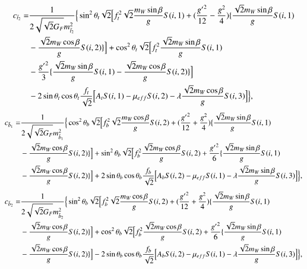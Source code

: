 \documentclass[final,3p,times]{elsarticle}
\begin{document}
\begin{equation}
\begin{aligned}
c_{\tilde{t}_2} = & {1 \over 2\sqrt{\sqrt{2}G_{F}} m_{\tilde{t}_2}^2}\Big\{\sin^2 \theta_t \sqrt{2}\Big[f_{t}^2 \sqrt{2} {m_{W} \sin\beta \over g} S(i,1) + ({{g'}^2 \over 12} - {g^2 \over 4}) \{{\sqrt{2} m_{W} \sin\beta \over g} S(i,1) \\ & -{\sqrt{2} m_{W} \cos\beta \over g}S(i,2)\}\Big] + \cos^2 \theta_t \sqrt{2} \Big[ f_{t}^2 {\sqrt{2} m_{W} \sin\beta \over g}S(i,1) \\ & - {{g'}^2 \over 3}\{{\sqrt{2} m_{W} \sin\beta \over g}S(i,1) - {\sqrt{2} m_{W} \cos\beta \over g} S(i,2)\}\Big] \\ & - 2\sin\theta_t \cos\theta_t {f_{t} \over \sqrt{2}}\Big[A_{t}S(i,1) - \mu_{eff}S(i,2) - \lambda {\sqrt{2} m_{W} \cos\beta \over g}S(i,3)\Big]\Big\},
\end{aligned}
\end{equation}
\begin{equation}
\begin{aligned}
c_{\tilde{b}_1} = & {1 \over 2\sqrt{\sqrt{2}G_{F}} m_{\tilde{b}_1}^2}\Big\{\cos^2 \theta_b \sqrt{2}\Big[f_{b}^2 \sqrt{2} {m_{W} \cos\beta \over g} S(i,2) + ({{g'}^2 \over 12} + {g^2 \over 4}) \{{\sqrt{2} m_{W} \sin\beta \over g} S(i,1) \\ & -{\sqrt{2} m_{W} \cos\beta \over g}S(i,2)\}\Big] + \sin^2 \theta_b \sqrt{2} \Big[ f_{b}^2 {\sqrt{2} m_{W} \cos\beta \over g}S(i,2) + {{g'}^2 \over 6}\{{\sqrt{2} m_{W} \sin\beta \over g}S(i,1) \\ & - {\sqrt{2} m_{W} \cos\beta \over g} S(i,2)\}\Big] + 2\sin\theta_b \cos\theta_b {f_{b} \over \sqrt{2}}\Big[A_{b}S(i,2) - \mu_{eff}S(i,1) - \lambda {\sqrt{2} m_{W} \sin\beta \over g}S(i,3)\Big]\Big\},
\end{aligned}
\end{equation}
\begin{equation}
\begin{aligned}
c_{\tilde{b}_2} = & {1 \over 2\sqrt{\sqrt{2}G_{F}} m_{\tilde{b}_2}^2}\Big\{\sin^2 \theta_b \sqrt{2}\Big[f_{b}^2 \sqrt{2} {m_{W} \cos\beta \over g} S(i,2) + ({{g'}^2 \over 12} + {g^2 \over 4}) \{{\sqrt{2} m_{W} \sin\beta \over g} S(i,1) \\ & -{\sqrt{2} m_{W} \cos\beta \over g}S(i,2)\}\Big] + \cos^2 \theta_b \sqrt{2} \Big[ f_{b}^2 {\sqrt{2} m_{W} \cos\beta \over g}S(i,2) + {{g'}^2 \over 6}\{{\sqrt{2} m_{W} \sin\beta \over g}S(i,1) \\ & - {\sqrt{2} m_{W} \cos\beta \over g} S(i,2)\}\Big] - 2\sin\theta_b \cos\theta_b {f_{b} \over \sqrt{2}}\Big[A_{b}S(i,2) - \mu_{eff}S(i,1) - \lambda {\sqrt{2} m_{W} \sin\beta \over g}S(i,3)\Big]\Big\},
\end{aligned}
\end{equation}
\end{document}

